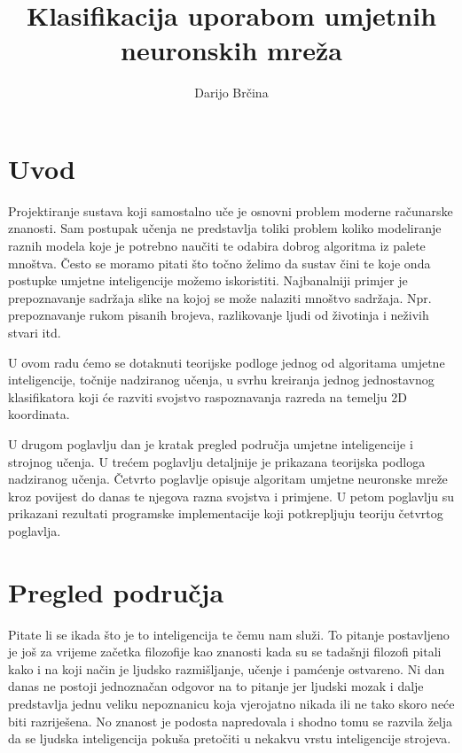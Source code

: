 \documentclass[times, utf8, zavrsni]{fer}
\begin{document}
\title{Klasifikacija uporabom umjetnih neuronskih mreža}
\author{Darijo Brčina}

\maketitle




\tableofcontents

\chapter{Uvod}
Projektiranje sustava koji samostalno uče je osnovni problem moderne računarske znanosti. Sam postupak učenja ne predstavlja toliki problem koliko modeliranje raznih modela koje je potrebno naučiti te odabira dobrog algoritma iz palete mnoštva. Često se moramo pitati što točno želimo da sustav čini te koje onda postupke umjetne inteligencije možemo iskoristiti. Najbanalniji primjer je prepoznavanje sadržaja slike na kojoj se može nalaziti mnoštvo sadržaja. Npr. prepoznavanje rukom pisanih brojeva, razlikovanje ljudi od životinja i neživih stvari itd.

U ovom radu ćemo se dotaknuti teorijske podloge jednog od algoritama umjetne inteligencije, točnije nadziranog učenja, u svrhu kreiranja jednog jednostavnog klasifikatora koji će razviti svojstvo raspoznavanja razreda na temelju 2D koordinata.

\bigskip
U drugom poglavlju dan je kratak pregled područja umjetne inteligencije i strojnog učenja. U trećem poglavlju detaljnije je prikazana teorijska podloga nadziranog učenja. Četvrto poglavlje opisuje algoritam umjetne neuronske mreže kroz povijest do danas te njegova razna svojstva i primjene. U petom poglavlju su prikazani rezultati programske implementacije koji potkrepljuju teoriju četvrtog poglavlja.

\chapter{{Pregled područja}}
Pitate li se ikada što je to inteligencija te čemu nam služi. To pitanje postavljeno je još za vrijeme začetka filozofije kao znanosti kada su se tadašnji filozofi pitali kako i na koji način je ljudsko razmišljanje, učenje i pamćenje ostvareno. Ni dan danas ne postoji jednoznačan odgovor na to pitanje jer ljudski mozak i dalje predstavlja jednu veliku nepoznanicu koja vjerojatno nikada ili ne tako skoro neće biti razriješena. No znanost je podosta napredovala i shodno tomu se razvila želja da se ljudska inteligencija pokuša pretočiti u nekakvu vrstu inteligencije strojeva.
\end{document}
